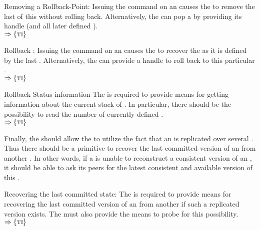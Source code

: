 \documentclass[a4paper, 12pt]{book}
\newcommand{\INTERFACE}[1]{$\Rightarrow\left\{#1\right\}$}
\begin{document}
\begin{requirement*}{Removing a Rollback-Point: \dbaiPOPROLLBACK}
  Issuing the command \dbaiPOPROLLBACK on an  causes the
  \SYNEIGHT to remove the last  of this 
  without rolling back. Alternatively, the  can pop a
   by providing its handle (and all later defined
  ).\\
  \INTERFACE{\TRANSACTION}
\end{requirement*}

\begin{requirement*}{Rollback : \dbaiROLLBACK}
  Issuing the command \dbaiROLLBACK on an  causes the
  \SYNEIGHT to recover the  as it is defined by the
  last . Alternatively, the  can provide a
   handle to roll back to this particular
  .\\
  \INTERFACE{\TRANSACTION}
\end{requirement*}

\begin{requirement*}{Rollback Status information}
  The \SYNEIGHT is required to provide means for getting information
  about the current stack of . In particular, there should
  be the possibility to read the number of currently defined
  .\\
  \INTERFACE{\TRANSACTION}
\end{requirement*}

Finally, the \SYNEIGHT should allow the  to utilize the fact
that an  is replicated over several . Thus there should be a primitive to recover the last committed
version of an  from another . 
%
In other words, if a  is unable to reconstruct a
consistent version of an , it should be able to ask its
peers for the latest consistent and available version of this .
%
\begin{requirement*}{Recovering the last committed state: \dbaiNETRECOVER}
  The \SYNEIGHT is required to provide means for recovering the last
  committed version of an  from another 
  if such a replicated version exists.
  The \SYNEIGHT must also provide the means to
  probe for this possibility.\\
  \INTERFACE{\TRANSACTION}
\end{requirement*}
\end{document}

